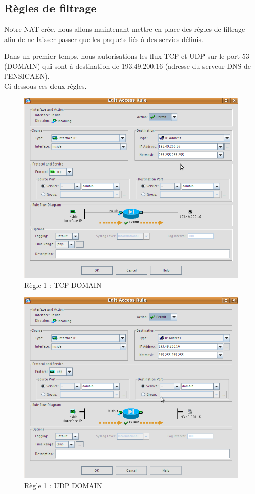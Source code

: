 \documentclass[a4paper,12pt]{article}
\begin{document}
\subsection{Règles de filtrage}
Notre NAT crée, nous allons maintenant mettre en place des règles de filtrage afin de ne laisser passer que les paquets liés à des servies définis.

Dans un premier temps, nous autorisations les flux TCP et UDP sur le port 53 (DOMAIN) qui sont à destination de 193.49.200.16 (adresse du serveur DNS de l'ENSICAEN).\\
Ci-dessous ces deux règles.
\begin{figure}[H]
	\center
	\includegraphics[width=15cm]{img/4-RegleTCP(DOMAIN).png}
	\caption{Règle 1 : TCP DOMAIN}
\end{figure}
\begin{figure}[H]
	\center
	\includegraphics[width=15cm]{img/4-RegleUDP(DOMAIN).png}
	\caption{Règle 1 : UDP DOMAIN}
\end{figure}
\end{document}
